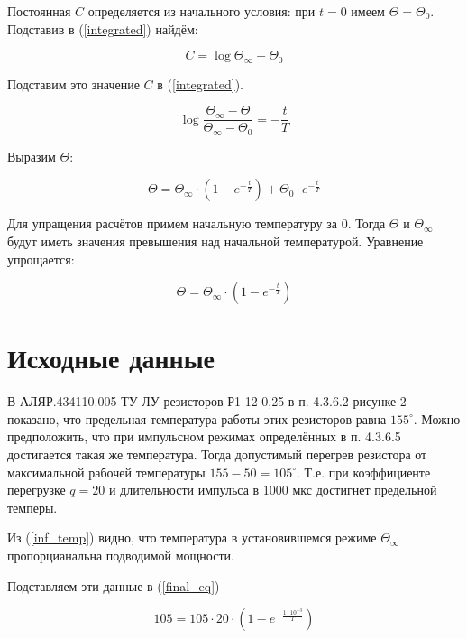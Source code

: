 \documentclass[a4paper]{article}
\begin{document}
Постоянная $C$ определяется из начального условия: при $t=0$ имеем
$\Theta=\Theta_{0}$. Подставив в (\ref{integrated}) найдём:

\begin{equation}
C=\log{{\Theta}_{\infty}-{\Theta}_{0}}
\end{equation}

Подставим это значение $C$ в (\ref{integrated}).

\begin{equation}
\log{\frac{{\Theta}_{\infty}-{\Theta}}{{\Theta}_{\infty}-{\Theta}_{0}}}=-\frac{t}{T}
\end{equation}

Выразим $\Theta$:

\begin{equation}
\Theta = {\Theta}_{\infty}{\cdot}(1-e^{-\frac{t}{T}}) +
         {\Theta}_{0}{\cdot}e^{-\frac{t}{T}}
\end{equation}

Для упращения расчётов примем начальную температуру за $0$. Тогда $\Theta$
и $\Theta_\infty$ будут иметь значения превышения над начальной температурой.
Уравнение упрощается:

\begin{equation}
\label{final_eq}
\Theta = {\Theta}_{\infty}{\cdot}(1-e^{-\frac{t}{T}})
\end{equation}

\section{Исходные данные}

	В АЛЯР.434110.005 ТУ-ЛУ \cite{alyr.434110.005} резисторов Р1-12-0,25 в п.
4.3.6.2 рисунке 2 показано, что предельная температура работы этих резисторов равна
$155^{\circ}$. Можно предположить, что при импульсном режимах определённых в п.
4.3.6.5 достигается такая же температура. Тогда допустимый перегрев резистора от
максимальной рабочей температуры $155-50=105^{\circ}$. Т.е. при коэффициенте
перегрузке $q=20$ и длительности импульса в 1000 мкс достигнет предельной темперы.

    Из (\ref{inf_temp}) видно, что температура в установившемся режиме
${\Theta}_{\infty}$ пропорцианальна подводимой мощности.

    Подставляем эти данные в (\ref{final_eq})

\begin{equation}
105 = 105{\cdot}20{\cdot}(1-e^{-\frac{1{\cdot}10^{-3}}{T}})
\end{equation}
\end{document}
